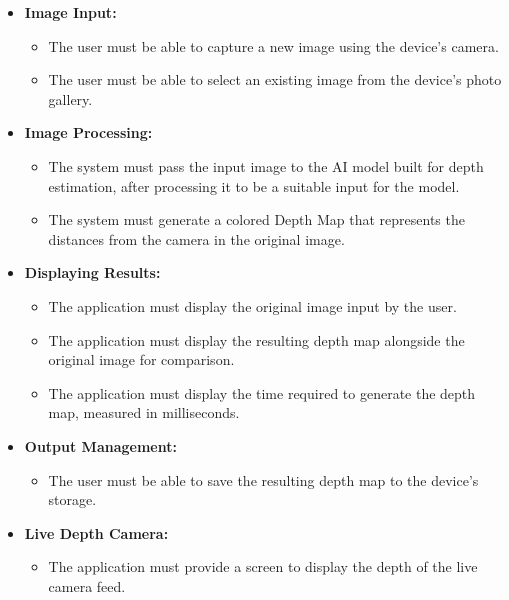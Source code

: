 \begin{itemize}
   \item \textbf{Image Input:}
    \begin{itemize}
        \item The user must be able to capture a new image using the device's camera.
        \item The user must be able to select an existing image from the device's photo gallery.
    \end{itemize}

    \item \textbf{Image Processing:}
    \begin{itemize}
        \item The system must pass the input image to the AI model built for depth estimation, after processing it to be a suitable input for the model.
        \item The system must generate a colored Depth Map that represents the distances from the camera in the original image.
    \end{itemize}

    \item \textbf{Displaying Results:}
    \begin{itemize}
        \item The application must display the original image input by the user.
        \item The application must display the resulting depth map alongside the original image for comparison.
        \item The application must display the time required to generate the depth map, measured in milliseconds.
    \end{itemize}

    \item \textbf{Output Management:}
    \begin{itemize}
        \item The user must be able to save the resulting depth map to the device's storage.
    \end{itemize}

    \item \textbf{Live Depth Camera:}
    \begin{itemize}
        \item The application must provide a screen to display the depth of the live camera feed.
    \end{itemize}
\end{itemize}

